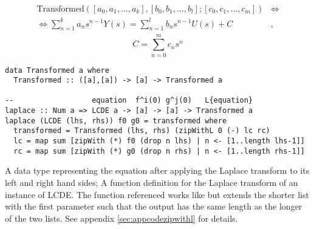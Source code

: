 \begin{align*}\begin{split}%
\text{Transformed}([a_0,a_1,...,a_k],[b_0,b_1,...,b_l];[c_0,c_1,...,c_m]) &\iff\\\iff \sum\limits^{k}_{n=1}{a_n s^{n-1} Y(s)} = \sum\limits^{l}_{n=1}{b_n s^{n-1} U(s)} + C&,
\end{split}\end{align*}
\begin{equation}\label{eq:csnterms}
C = \sum\limits^{m}_{n=0}{c_n s^n}
\end{equation}

\iffalse
\begin{code}[label={code:tflaplace},caption={A data type representing the equation after applying the Laplace transform to its left and right hand sides; A function definition for the Laplace transform of an instance of LCDE. The function \cmd{zipWidthL} referenced works like \cmd{zipWith} but extends the shorter list with the first parameter such that the output has the same length as the longer of the two lists. See appendix \ref{sec:appcodezipwithl} for details.}]
data Transformed a where
  Transformed :: ([a],[a]) -> [a] -> Transformed a

--                  equation  f^i(0) g^j(0)   L{equation}
laplace :: Num a => LCDE a -> [a] -> [a] -> Transformed a
laplace (LCDE (lhs, rhs)) f0 g0 = transformed where
  transformed = Transformed (lhs, rhs) (zipWithL 0 (-) lc rc)
  lc = map sum [zipWith (*) f0 (drop n lhs) | n <- [1..length lhs-1]]
  rc = map sum [zipWith (*) g0 (drop n rhs) | n <- [1..length rhs-1]]
\end{code}\fi

\begin{codefig}
\begin{verbatim}
data Transformed a where
  Transformed :: ([a],[a]) -> [a] -> Transformed a

--                  equation  f^i(0) g^j(0)   L{equation}
laplace :: Num a => LCDE a -> [a] -> [a] -> Transformed a
laplace (LCDE (lhs, rhs)) f0 g0 = transformed where
  transformed = Transformed (lhs, rhs) (zipWithL 0 (-) lc rc)
  lc = map sum [zipWith (*) f0 (drop n lhs) | n <- [1..length lhs-1]]
  rc = map sum [zipWith (*) g0 (drop n rhs) | n <- [1..length rhs-1]]
\end{verbatim}
\caption{A data type representing the equation after applying the Laplace transform to its left and right hand sides; A function definition for the Laplace transform of an instance of LCDE. The function  referenced works like  but extends the shorter list with the first parameter such that the output has the same length as the longer of the two lists. See appendix \ref{sec:appcodezipwithl} for details.}
\label{code:tflaplace}
\end{codefig}

